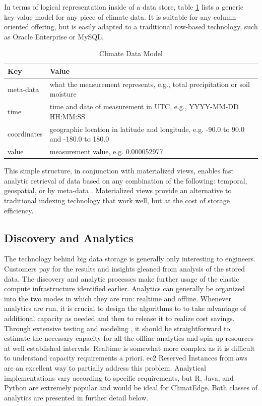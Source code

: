 In terms of logical representation inside of a data store, table \ref{model} lists a generic key-value model for any piece of climate data. It is suitable for any column oriented offering, but is easily adapted to a traditional row-based technology, such as Oracle Enterprise or MySQL.
\begin{table}[htbp]
    \centering
    \begin{tabular}{l l}
        \hline
	Key & Value \\ [0.5ex]
	\hline
	meta-data & what the measurement represents, e.g., total precipitation or soil moisture\\
	time & time and date of measurement in UTC, e.g., YYYY-MM-DD HH:MM:SS\\
	coordinates & geographic location in latitude and longitude, e.g. -90.0 to 90.0 and -180.0 to 180.0\\
	value & measurement value, e.g. 0.000052977\\
	\hline
    \end{tabular}
    \caption{Climate Data Model}
    \label{model}
\end{table}
This simple structure, in conjunction with materialized views, enables fast analytic retrieval of data based on any combination of the following: temporal, geospatial, or by meta-data \cite{materialized_views}. Materialized views provide an alternative to traditional indexing technology that work well, but at the cost of storage efficiency. 
\subsection{Discovery and Analytics}
The technology behind big data storage is generally only interesting to engineers. Customers pay for the results and insights gleaned from analysis of the stored data. The discovery and analytic processes make further usage of the elastic compute infrastructure identified earlier. Analytics can generally be organized into the two modes in which they are run: realtime and offline. Whenever analytics are run, it is crucial to design the algorithms to to take advantage of additional capacity as needed and then to release it to realize cost savings. Through extensive testing and modeling , it should be straightforward to estimate the necessary capacity for all the offline analytics and spin up resources at well established intervals. Realtime is somewhat more complex as it is difficult to understand capacity requirements a priori. \gls{ec2} Reserved Instances from \gls{aws} are an excellent way to partially address this problem. Analytical implementations vary according to specific requirements, but R, Java, and Python are extremely popular and would be ideal for ClimatEdge\texttrademark{}. Both classes of analytics are presented in further detail below.
